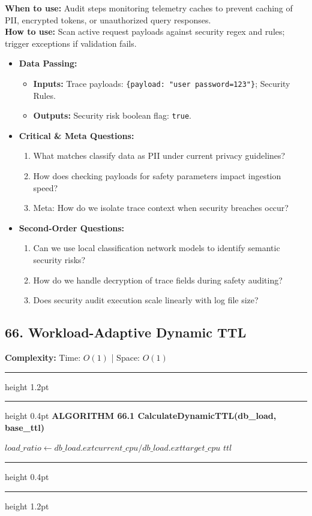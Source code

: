 \documentclass[11pt,a4paper]{article}
\newenvironment{textbookalgo}[2]{%
  \par\addvspace{1.2em}\noindent
  \hrule height 1.2pt
  \vspace{1.5pt}
  \hrule height 0.4pt
  \vspace{5pt}
  {\noindent\large\bfseries\sffamily ALGORITHM #1 \quad #2}
  \par\vspace{5pt}
  \RestyleAlgo{plain}
}{%
  \par\vspace{4pt}
  \hrule height 0.4pt
  \vspace{1.5pt}
  \hrule height 1.2pt
  \par\addvspace{1.2em}
}
\theoremstyle{definition}
\begin{document}
\noindent
\textbf{When to use:} Audit steps monitoring telemetry caches to prevent caching of PII, encrypted tokens, or unauthorized query responses.\\
\textbf{How to use:} Scan active request payloads against security regex and rules; trigger exceptions if validation fails.
\begin{itemize}[leftmargin=*]
  \item[] \textbf{Data Passing:}
    \begin{itemize}
      \item \textbf{Inputs:} Trace payloads: \texttt{\{payload: "user password=123"\}}; Security Rules.
      \item \textbf{Outputs:} Security risk boolean flag: \texttt{true}.
    \end{itemize}
  \item[] \textbf{Critical \& Meta Questions:}
  \begin{enumerate}
    \item What matches classify data as PII under current privacy guidelines?
    \item How does checking payloads for safety parameters impact ingestion speed?
    \item Meta: How do we isolate trace context when security breaches occur?
  \end{enumerate}
  \item[] \textbf{Second-Order Questions:}
  \begin{enumerate}
    \item Can we use local classification network models to identify semantic security risks?
    \item How do we handle decryption of trace fields during safety auditing?
    \item Does security audit execution scale linearly with log file size?
  \end{enumerate}
\end{itemize}
\medskip

\clearpage
\subsection{66. Workload-Adaptive Dynamic TTL}


\noindent
\textbf{Complexity:} Time: $O(1)$ | Space: $O(1)$
\smallskip

\begin{textbookalgo}{66.1}{CalculateDynamicTTL(db\_load, base\_ttl)}
\begin{algorithm}[H]
$load\_ratio \leftarrow db\_load.	ext{current\_cpu} / db\_load.	ext{target\_cpu}$\;
\Return $ttl$\;
\end{algorithm}
\end{textbookalgo}
\end{document}
